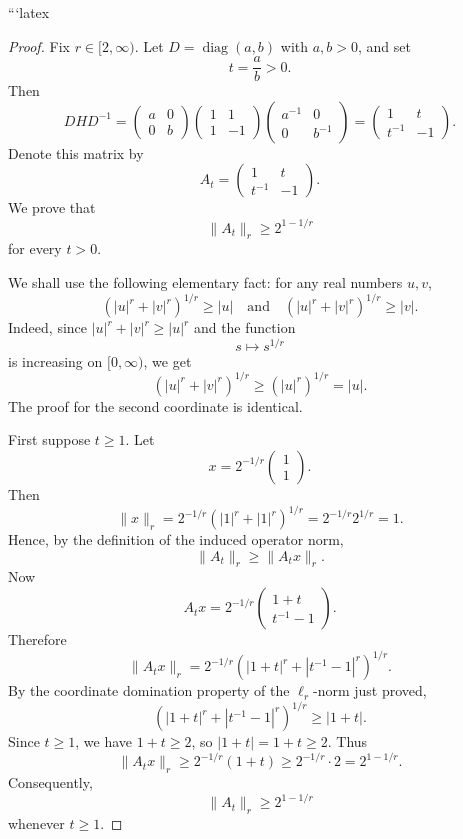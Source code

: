 ```latex
\begin{proof}
Fix \(r \in [2,\infty)\). Let \(D=\operatorname{diag}(a,b)\) with \(a,b>0\), and set
\[
t=\frac{a}{b}>0.
\]
Then
\[
DHD^{-1}
=
\begin{pmatrix}
a & 0\\
0 & b
\end{pmatrix}
\begin{pmatrix}
1 & 1\\
1 & -1
\end{pmatrix}
\begin{pmatrix}
a^{-1} & 0\\
0 & b^{-1}
\end{pmatrix}
=
\begin{pmatrix}
1 & t\\
t^{-1} & -1
\end{pmatrix}.
\]
Denote this matrix by
\[
A_t=\begin{pmatrix}
1 & t\\
t^{-1} & -1
\end{pmatrix}.
\]
We prove that
\[
\|A_t\|_r \geq 2^{1-1/r}
\]
for every \(t>0\).

We shall use the following elementary fact: for any real numbers \(u,v\),
\[
\left(|u|^r+|v|^r\right)^{1/r} \geq |u|
\quad\text{and}\quad
\left(|u|^r+|v|^r\right)^{1/r} \geq |v|.
\]
Indeed, since \(|u|^r+|v|^r \geq |u|^r\) and the function
\[
s \mapsto s^{1/r}
\]
is increasing on \([0,\infty)\), we get
\[
\left(|u|^r+|v|^r\right)^{1/r} \geq \left(|u|^r\right)^{1/r}=|u|.
\]
The proof for the second coordinate is identical.

First suppose \(t\geq 1\). Let
\[
x=2^{-1/r}\begin{pmatrix}1\\1\end{pmatrix}.
\]
Then
\[
\|x\|_r
=
2^{-1/r}\left(|1|^r+|1|^r\right)^{1/r}
=
2^{-1/r}2^{1/r}
=
1.
\]
Hence, by the definition of the induced operator norm,
\[
\|A_t\|_r \geq \|A_t x\|_r.
\]
Now
\[
A_t x
=
2^{-1/r}
\begin{pmatrix}
1+t\\
t^{-1}-1
\end{pmatrix}.
\]
Therefore
\[
\|A_t x\|_r
=
2^{-1/r}
\left(|1+t|^r+|t^{-1}-1|^r\right)^{1/r}.
\]
By the coordinate domination property of the \(\ell_r\)-norm just proved,
\[
\left(|1+t|^r+|t^{-1}-1|^r\right)^{1/r}
\geq |1+t|.
\]
Since \(t\geq 1\), we have \(1+t\geq 2\), so \(|1+t|=1+t\geq 2\). Thus
\[
\|A_t x\|_r
\geq
2^{-1/r}(1+t)
\geq
2^{-1/r}\cdot 2
=
2^{1-1/r}.
\]
Consequently,
\[
\|A_t\|_r \geq 2^{1-1/r}
\]
whenever \(t\geq 1\).


\end{proof}
